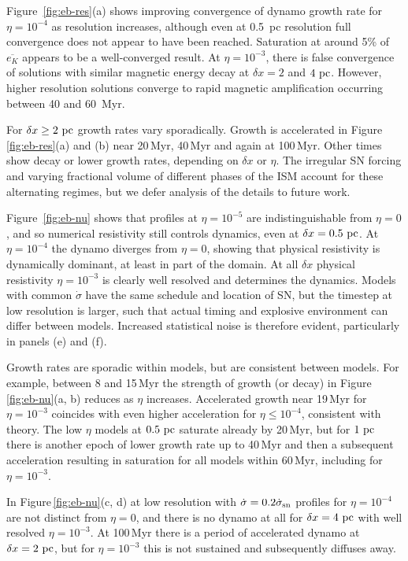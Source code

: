 \documentclass[preprint2]{aastex63}
\newcommand\SNr{\dot\sigma_{\rm sn}}
\newcommand\pc{~ {\rm pc}}
\newcommand\dx{ {\delta x}}
\begin{document}
      Figure~\ref{fig:eb-res}(a) shows improving convergence of dynamo growth 
      rate for $\eta=10^{-4}$
      as resolution increases, although even at 0.5~pc resolution full
      convergence does not appear to have been reached.
Saturation at around 5\% of $\overline{e_K}$
     appears to be a well-converged result.
 At $\eta=10^{-3}$, there is false convergence \citep{FMA91} of solutions with
 similar magnetic energy decay at $\dx=2$ and $4\pc$.
 However, higher resolution solutions converge to rapid magnetic
 amplification occurring between 40 and 60~Myr.
 
 For $\dx\geq2\pc$ growth rates vary sporadically.
 Growth is accelerated in Figure\,\ref{fig:eb-res}(a) and (b) near 20\,Myr,
 40\,Myr and again at 100\,Myr.
 Other times show decay or lower growth rates, depending on $\dx$ or $\eta$.
 The irregular SN forcing and varying fractional volume of
      different phases of the ISM  
 account for these alternating regimes, but we defer analysis of the details
 to future work.
 

       Figure~\ref{fig:eb-nu} shows that 
 profiles at $\eta=10^{-5}$ are
 indistinguishable from $\eta=0$, and so numerical resistivity still
 controls dynamics,
     even at $\delta x = 0.5\pc$.
 At $\eta=10^{-4}$ the dynamo diverges from $\eta=0$, showing that physical
 resistivity is dynamically dominant, at least in part of the domain.
 At all $\dx$ physical resistivity $\eta=10^{-3}$ is clearly well resolved
 and determines the dynamics.
 Models with common $\dot\sigma$ have the same schedule and location of SN,
 but the timestep at low resolution is larger, such that actual timing and
 explosive environment can differ between models.
 Increased statistical noise is therefore evident, particularly in panels (e) and (f).


 Growth rates are sporadic within models, but are consistent between
 models.
 For example, between 8 and 15\,Myr the strength of growth (or decay) in 
 Figure\,\ref{fig:eb-nu}(a, b) reduces as $\eta$ increases.
 Accelerated growth near 19\,Myr for $\eta=10^{-3}$ coincides with
 even higher acceleration for $\eta\le10^{-4}$, consistent with theory.
 The low $\eta$ models at $0.5\pc$ saturate already by 20\,Myr, but for $1\pc$
 there is another epoch of lower growth rate up to 40\,Myr and then a
 subsequent acceleration resulting in saturation for all models within
 60\,Myr, including for $\eta=10^{-3}$.

 In Figure\,\ref{fig:eb-nu}(c, d) at low resolution with
 $\dot\sigma=0.2\SNr$ profiles for $\eta=10^{-4}$ are not distinct from $\eta=0$,
 and there is no dynamo at all for $\dx=4\pc$ with well resolved $\eta=10^{-3}$.
 At 100\,Myr there is a period of accelerated dynamo at $\dx=2\pc$, but 
 for $\eta=10^{-3}$ this is not sustained and subsequently diffuses away.
\end{document}

